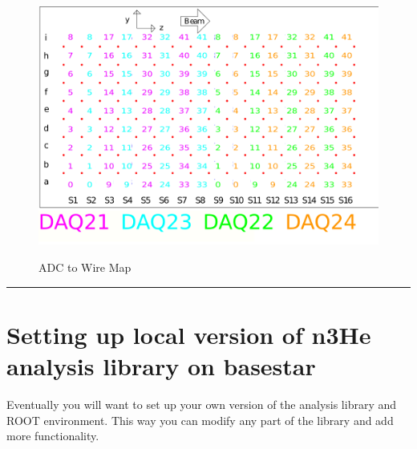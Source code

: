 \documentclass[12pt]{article}
\begin{document}
\begin{figure}[htb]
\centering
\includegraphics[width=6in]{adc2wire.png}\\
\caption{ADC to Wire Map}\label{f3}
\end{figure}


\noindent
{\color{red} \rule{\linewidth}{1mm} }
 
\newpage
\section{Setting up local version of n3He analysis library on basestar}
Eventually you will want to set up your own version of the analysis library and ROOT environment. This way you can modify any
part of the library and add more functionality. 
\end{document}

